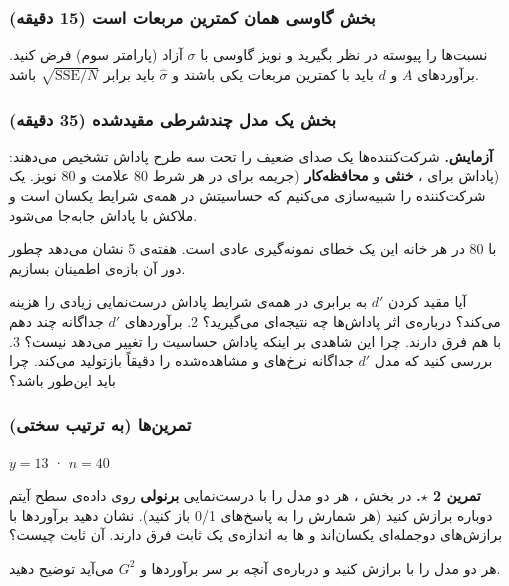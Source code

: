 \subsubsection{\texorpdfstring{بخش  گاوسی همان کمترین مربعات
است (15 دقیقه)}{بخش C: MLE گاوسی همان کمترین مربعات است (15 دقیقه)}}

نسبت‌ها را پیوسته در نظر بگیرید و نویز گاوسی با \(\sigma\) آزاد (پارامتر
سوم) فرض کنید. برآوردهای \(A\) و \(d\) باید با کمترین مربعات یکی باشند و
\(\hat\sigma\) باید برابر \(\sqrt{\mathrm{SSE}/N}\) باشد.

\subsubsection{\texorpdfstring{بخش  یک مدل  چندشرطی
مقیدشده (35 دقیقه)}{بخش D: یک مدل SDT چندشرطی مقیدشده (35 دقیقه)}}

\textbf{آزمایش.} شرکت‌کننده‌ها یک صدای ضعیف را تحت سه طرح پاداش تشخیص
می‌دهند: \textbf{} (پاداش برای ، \textbf{خنثی} و
\textbf{محافظه‌کار} (جریمه برای  در هر شرط 80
 علامت و 80  نویز. یک شرکت‌کننده را شبیه‌سازی می‌کنیم
که حساسیتش در همه‌ی شرایط یکسان است و ملاکش با پاداش جابه‌جا می‌شود.

با 80  در هر خانه این یک خطای نمونه‌گیری عادی است. هفته‌ی 5 نشان
می‌دهد چطور دور آن بازه‌ی اطمینان بسازیم.

آیا مقید کردن \(d'\) به برابری در همه‌ی شرایط پاداش درست‌نمایی زیادی را
هزینه می‌کند؟ درباره‌ی اثر پاداش‌ها چه نتیجه‌ای می‌گیرید؟ 2. برآوردهای \(d'\)
جداگانه چند دهم با هم فرق دارند. چرا این شاهدی بر اینکه پاداش حساسیت را
تغییر می‌دهد نیست؟ 3. بررسی کنید که مدل \(d'\) جداگانه نرخ‌های  و
 مشاهده‌شده را دقیقاً بازتولید می‌کند. چرا باید این‌طور
باشد؟

\subsubsection{تمرین‌ها (به ترتیب سختی)}

\(y = 13\) · \(n = 40\)

\textbf{تمرین 2 \ensuremath{\star}.} در بخش ، هر دو مدل را با درست‌نمایی
\textbf{برنولی} روی داده‌ی سطح آیتم دوباره برازش کنید (هر شمارش را به
پاسخ‌های 0/1 باز کنید). نشان دهید برآوردها با برازش‌های دوجمله‌ای یکسان‌اند
و ها به اندازه‌ی یک ثابت فرق دارند. آن ثابت چیست؟

هر دو مدل را با  برازش کنید و درباره‌ی آنچه بر سر برآوردها و
\(G^2\) می‌آید توضیح دهید.

